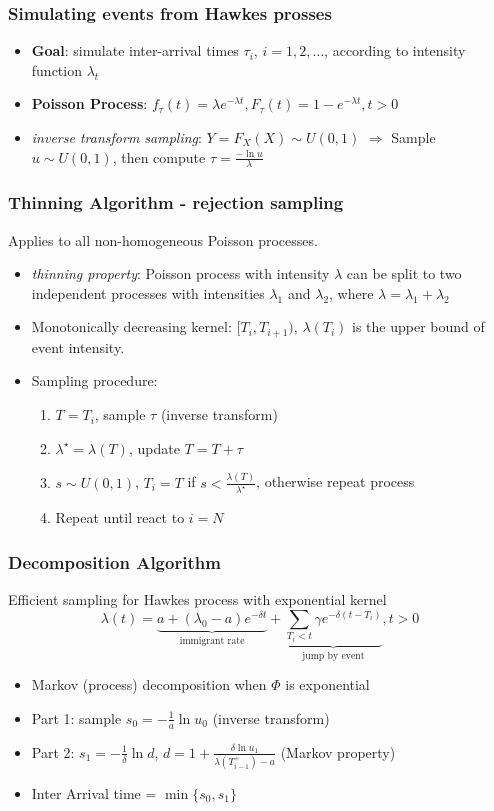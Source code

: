 \documentclass{beamer}
\begin{document}
\begin{frame}
	\frametitle{Simulating events from Hawkes prosses}
	\begin{itemize}
		\item \textbf{Goal}: simulate inter-arrival times $\tau_i$, $i=1,2,\dots$, according to intensity function $\lambda_t$
		\item \textbf{Poisson Process}: $f_{\tau}(t)=\lambda e^{-\lambda t},F_{\tau}(t)=1-e^{-\lambda t} , t>0$
		\item \textit{inverse transform sampling}: $Y=F_X(X) \sim U(0,1)$ $\Rightarrow$ Sample $u\sim U(0,1)$, then compute $\tau=\frac{- \ln u}{\lambda}$
	\end{itemize}
\end{frame}

\begin{frame}
\frametitle{Thinning Algorithm - rejection sampling}
Applies to all non-homogeneous Poisson processes. 
\begin{itemize}
	\item \textit{thinning property}: Poisson process with intensity $\lambda$ can be split to two independent processes with intensities $\lambda_1$ and $\lambda_2$, where $\lambda = \lambda_1+\lambda_2$
	\item Monotonically decreasing kernel: $[T_i,T_{i+1})$, $\lambda(T_i)$ is the upper bound of event intensity.
	\item Sampling procedure:
	\begin{enumerate}
		\item $T=T_i$, sample $\tau$ (inverse transform)
		\item $\lambda^{\star}=\lambda(T)$, update $T=T+\tau$
		\item $s\sim U(0,1)$, $T_i=T$ if $s<\frac{\lambda(T)}{\lambda^{\star}}$, otherwise repeat process
		\item Repeat until react to $i=N$
	\end{enumerate}
\end{itemize}
\end{frame}

\begin{frame}
\frametitle{Decomposition Algorithm}
Efficient sampling for Hawkes process with exponential kernel
\[\lambda(t)=\underbrace{a+(\lambda_0-a)e^{-\delta t}}_{\text{immigrant rate}}+\underbrace{\sum_{T_i<t}\gamma e^{-\delta(t-T_i)}}_{\text{jump by event}}, t>0 \]
\begin{itemize}
	\item Markov (process) decomposition when $\Phi$ is exponential
	\item Part 1: sample $s_0=-\frac{1}{a}\ln u_0$ (inverse transform)
	\item Part 2: $s_1=-\frac{1}{\delta}\ln d$, $d=1+\frac{\delta \ln u_1}{\lambda(T^+_{i-1})-a}$ (Markov property)
	\item Inter Arrival time = $\min\{s_0,s_1\}$
\end{itemize}
\end{frame}
\end{document}
